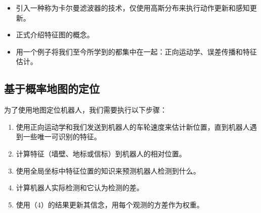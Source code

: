 \begin{itemize}

\item 引入一种称为卡尔曼滤波器的技术，仅使用高斯分布来执行动作更新和感知更新。
\item 正式介绍特征图的概念。
\item 用一个例子将我们至今所学到的都集中在一起：正向运动学、误差传播和特征估计。
\end{itemize}


\subsection{基于概率地图的定位}
为了使用地图定位机器人，我们需要执行以下步骤：

\begin{enumerate}

\item 使用正向运动学和我们发送到机器人的车轮速度来估计新位置，直到机器人遇到一些唯一可识别的特征。
\item 计算特征（墙壁、地标或信标）到机器人的相对位置。
\item 使用全局坐标中特征位置的知识来预测机器人检测到什么。
\item 计算机器人实际检测和它认为检测的差。
\item 使用（4）的结果更新其信念，用每个观测的方差作为权重。
\end{enumerate}

